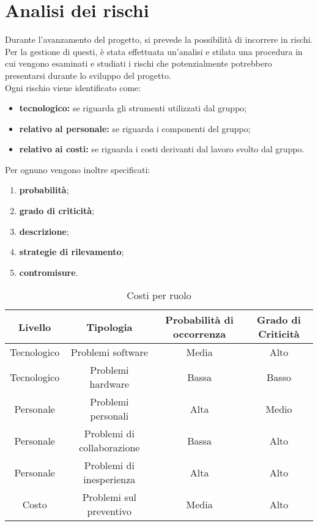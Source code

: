 \section{Analisi dei rischi}
Durante l'avanzamento del progetto, si prevede la possibilità di incorrere in rischi. Per la gestione di questi, è stata effettuata un'analisi e stilata una procedura in cui vengono esaminati e studiati i rischi che potenzialmente potrebbero presentarsi durante lo sviluppo del progetto. \\
Ogni rischio viene identificato come:
\begin{itemize}
\item \textbf{tecnologico:} se riguarda gli strumenti utilizzati dal gruppo;
\item \textbf{relativo al personale:} se riguarda i componenti del gruppo;
\item \textbf{relativo ai costi:} se riguarda i costi derivanti dal lavoro svolto dal gruppo.
\end{itemize}
Per ognuno vengono inoltre specificati:
\begin{enumerate}
	\item \textbf{probabilità};
	\item \textbf{grado di criticità};
	\item \textbf{descrizione};
	\item \textbf{strategie di rilevamento};
	\item \textbf{contromisure}.
\end{enumerate}

\begin{table}[H]
	\centering
	\begin{tabular}{|c|c|c|c|}
		\hline
		\textbf{Livello} &
		\textbf{Tipologia} &
		\textbf{Probabilità di occorrenza} &
		\textbf{Grado di Criticità}\\
		\hline
		Tecnologico & Problemi software & Media & Alto\\
		\hline
		Tecnologico & Problemi hardware & Bassa & Basso\\
		\hline
		Personale & Problemi personali & Alta & Medio\\
		\hline
		Personale & Problemi di collaborazione & Bassa & Alto\\
		\hline 
		Personale & Problemi di inesperienza & Alta & Alto \\
		\hline
		Costo &  Problemi sul preventivo & Media & Alto \\
		\hline
	\end{tabular}
	\caption{Costi per ruolo}
\end{table}

